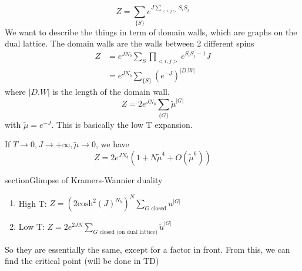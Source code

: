 \documentclass[a4paper]{book}
\theoremstyle{definition}
\theoremstyle{remark}
\begin{document}
\begin{equation}
    Z = \sum_{\{S\}} e^{J\sum_{<i,j>} S_iS_j}
\end{equation}
We want to describe the things in term of domain walls, which are graphs on the dual lattice. The domain walls are the walls between 2 different spins 
\begin{equation}
    \begin{aligned}
        Z &= e^{JN_b}\sum_S \prod_{<i,j>} e^{S_iS_j - 1}J \\
        &= e^{JN_b} \sum_{\{S\}}(e^{-J})^{|D.W|}
    \end{aligned}
\end{equation}
where $|D.W|$ is the length of the domain wall. 
\begin{equation}
    Z = 2e^{JN_b} \sum_{\{G\}}\tilde{\mu}^{|G|}
\end{equation}
with $\tilde{\mu} = e^{-J}$. This is basically the low T expansion. \par \medskip 

If $T\rightarrow 0, J \rightarrow +\infty, \tilde{\mu} \rightarrow 0$, we have 
\begin{equation}
    Z = 2e^{JN_b} (1 + N\tilde{\mu}^4 + O(\tilde{\mu}^6))
\end{equation}

section{Glimpse of Kramers-Wannier duality}
\begin{enumerate}
    \item High T: $Z = (2\text{cosh}^2(J)^{N_b})^N \sum_{G\text{ closed}} u^{|G|}$
    \item Low T: $Z = 2e^{2JN} \sum_{G\text{ closed (on dual lattice)}} \tilde{u}^{|G|}$
\end{enumerate}
So they are essentially the same, except for a factor in front. From this, we can find the critical point (will be done in TD)
\end{document}
